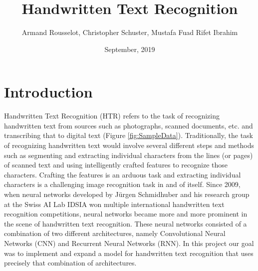 \documentclass{article}
\begin{document}
\title{Handwritten Text Recognition}
\date{September, 2019}
\author{Armand Rousselot, Christopher Schuster, Mustafa Fuad Rifet Ibrahim}

\maketitle
\newpage
\tableofcontents

\newpage
\section{Introduction}
Handwritten Text Recognition (HTR) refers to the task of recognizing handwritten text from sources such as photographs, scanned documents, etc. and transcribing that to digital text (Figure \ref{fig:SampleData}).
Traditionally, the task of recognizing handwritten text would involve several different steps and methods such as segmenting and extracting individual characters from the lines (or pages) of scanned text and using intelligently crafted features to recognize those characters. Crafting the features is an arduous task and extracting individual characters is a challenging image recognition task in and of itself. Since 2009, when neural networks developed by J\"urgen Schmidhuber and his research group at the Swiss AI Lab IDSIA won multiple international handwritten text recognition competitions\cite{Angelica}, neural networks became more and more prominent in the scene of handwritten text recognition. These neural networks consisted of a combination of two different architectures, namely Convolutional Neural Networks (CNN) and Recurrent Neural Networks (RNN). In this project our goal was to implement and expand a model for handwritten text recognition that uses precisely that combination of architectures. 
\end{document}
